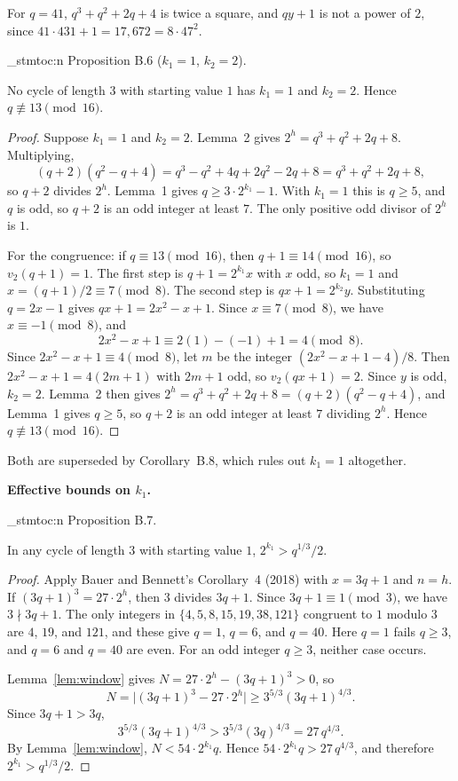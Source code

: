 \documentclass[11pt]{article}
\newenvironment{named}[1]{%
  \par\addvspace{\medskipamount}%
  \pagebreak[3]%
  \noindent{\bfseries #1}\space\ignorespaces
  \stmtoc{#1}%
}{\par\addvspace{\medskipamount}}
\newcommand{\topic}[1]{\par\noindent\textbf{#1}}
\newcommand{\stmtoc}[1]{ \qn_stmtoc:n {#1} }
\begin{document}
For $q = 41$, $q^3 + q^2 + 2q + 4$ is twice a square, and $qy + 1$ is not a power of $2$, since $41 \cdot 431 + 1 = 17{,}672 = 8 \cdot 47^2$.

\begin{named}{Proposition B.6 ($k_1 = 1$, $k_2 = 2$).}
No cycle of length $3$ with starting value $1$ has $k_1 = 1$ and $k_2 = 2$.
Hence $q \not\equiv 13 \pmod{16}$.
\end{named}

\begin{proof}
Suppose $k_1 = 1$ and $k_2 = 2$.
Lemma~2 gives $2^h = q^3 + q^2 + 2q + 8$.
Multiplying,
\[
(q+2)(q^2 - q + 4) = q^3 - q^2 + 4q + 2q^2 - 2q + 8 = q^3 + q^2 + 2q + 8,
\]
so $q+2$ divides $2^h$.
Lemma~1 gives $q \ge 3 \cdot 2^{k_1} - 1$.
With $k_1 = 1$ this is $q \ge 5$, and $q$ is odd, so $q+2$ is an odd integer at least $7$.
The only positive odd divisor of $2^h$ is $1$.

For the congruence: if $q \equiv 13 \pmod{16}$, then $q+1 \equiv 14 \pmod{16}$, so $v_2(q+1) = 1$.
The first step is $q+1 = 2^{k_1} x$ with $x$ odd, so $k_1 = 1$ and $x = (q+1)/2 \equiv 7 \pmod{8}$.
The second step is $qx + 1 = 2^{k_2} y$.
Substituting $q = 2x - 1$ gives $qx + 1 = 2x^2 - x + 1$.
Since $x \equiv 7 \pmod{8}$, we have $x \equiv -1 \pmod{8}$, and
\[
2x^2 - x + 1 \equiv 2(1) - (-1) + 1 = 4 \pmod{8}.
\]
Since $2x^2 - x + 1 \equiv 4 \pmod{8}$, let $m$ be the integer $(2x^2 - x + 1 - 4)/8$. Then $2x^2 - x + 1 = 4(2m+1)$ with $2m+1$ odd, so $v_2(qx + 1) = 2$.
Since $y$ is odd, $k_2 = 2$.
Lemma~2 then gives $2^h = q^3 + q^2 + 2q + 8 = (q+2)(q^2 - q + 4)$, and Lemma~1 gives $q \ge 5$, so $q+2$ is an odd integer at least $7$ dividing $2^h$.
Hence $q \not\equiv 13 \pmod{16}$.
\end{proof}

Both are superseded by Corollary~B.8, which rules out $k_1 = 1$ altogether.

\topic{Effective bounds on $k_1$.}
\begin{named}{Proposition B.7.}
In any cycle of length $3$ with starting value $1$, $2^{k_1} > q^{1/3}/2$.
\end{named}

\begin{proof}
Apply Bauer and Bennett's Corollary~4 (2018) with $x = 3q + 1$ and $n = h$.
If $(3q+1)^3 = 27 \cdot 2^h$, then $3$ divides $3q+1$.
Since $3q+1 \equiv 1 \pmod{3}$, we have $3 \nmid 3q+1$.
The only integers in $\{4, 5, 8, 15, 19, 38, 121\}$ congruent to $1$ modulo $3$ are $4$, $19$, and $121$, and these give $q = 1$, $q = 6$, and $q = 40$.
Here $q = 1$ fails $q \ge 3$, and $q = 6$ and $q = 40$ are even.
For an odd integer $q \ge 3$, neither case occurs.

Lemma~\ref{lem:window} gives $N = 27 \cdot 2^h - (3q+1)^3 > 0$, so
\[
N = \bigl|(3q+1)^3 - 27 \cdot 2^h\bigr| \ge 3^{5/3}(3q+1)^{4/3}.
\]
Since $3q+1 > 3q$,
\[
3^{5/3}(3q+1)^{4/3} > 3^{5/3}(3q)^{4/3} = 27\, q^{4/3}.
\]
By Lemma~\ref{lem:window}, $N < 54 \cdot 2^{k_1} q$.
Hence $54 \cdot 2^{k_1} q > 27\, q^{4/3}$, and therefore $2^{k_1} > q^{1/3}/2$.
\end{proof}
\end{document}
